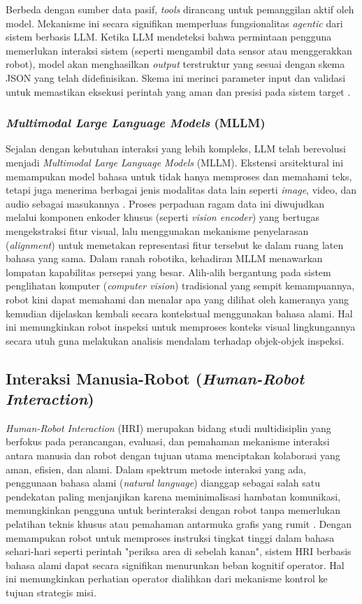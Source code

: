 Berbeda dengan sumber data pasif, \textit{tools} dirancang untuk pemanggilan aktif oleh model. Mekanisme ini secara signifikan memperluas fungsionalitas \textit{agentic} dari sistem berbasis LLM. Ketika LLM mendeteksi bahwa permintaan pengguna memerlukan interaksi sistem (seperti mengambil data sensor atau menggerakkan robot), model akan menghasilkan \textit{output} terstruktur yang sesuai dengan skema JSON yang telah didefinisikan. Skema ini merinci parameter input dan validasi untuk memastikan eksekusi perintah yang aman dan presisi pada sistem target \cite{singh2025survey}.

\subsubsection{\textit{Multimodal Large Language Models} (MLLM)}
Sejalan dengan kebutuhan interaksi yang lebih kompleks, LLM telah berevolusi menjadi \textit{Multimodal Large Language Models} (MLLM). Ekstensi arsitektural ini memampukan model bahasa untuk tidak hanya memproses dan memahami teks, tetapi juga menerima berbagai jenis modalitas data lain seperti \textit{image}, video, dan audio sebagai masukannya \cite{yin2024survey}. Proses perpaduan ragam data ini diwujudkan melalui komponen enkoder khusus (seperti \textit{vision encoder}) yang bertugas mengekstraksi fitur visual, lalu menggunakan mekanisme penyelarasan (\textit{alignment}) untuk memetakan representasi fitur tersebut ke dalam ruang laten bahasa yang sama. Dalam ranah robotika, kehadiran MLLM menawarkan lompatan kapabilitas persepsi yang besar. Alih-alih bergantung pada sistem penglihatan komputer (\textit{computer vision}) tradisional yang sempit kemampuannya, robot kini dapat memahami dan menalar apa yang dilihat oleh kameranya yang kemudian dijelaskan kembali secara kontekstual menggunakan bahasa alami. Hal ini memungkinkan robot inspeksi untuk memproses konteks visual lingkungannya secara utuh guna melakukan analisis mendalam terhadap objek-objek inspeksi.


\subsection{Interaksi Manusia-Robot (\textit{Human-Robot Interaction})}
\textit{Human-Robot Interaction} (HRI) merupakan bidang studi multidisiplin yang berfokus pada perancangan, evaluasi, dan pemahaman mekanisme interaksi antara manusia dan robot dengan tujuan utama menciptakan kolaborasi yang aman, efisien, dan alami. Dalam spektrum metode interaksi yang ada, penggunaan bahasa alami (\textit{natural language}) dianggap sebagai salah satu pendekatan paling menjanjikan karena meminimalisasi hambatan komunikasi, memungkinkan pengguna untuk berinteraksi dengan robot tanpa memerlukan pelatihan teknis khusus atau pemahaman antarmuka grafis yang rumit \cite{mavridis2015review}. Dengan memampukan robot untuk memproses instruksi tingkat tinggi dalam bahasa sehari-hari seperti perintah "periksa area di sebelah kanan", sistem HRI berbasis bahasa alami dapat secara signifikan menurunkan beban kognitif operator. Hal ini memungkinkan perhatian operator dialihkan dari mekanisme kontrol ke tujuan strategis misi.

